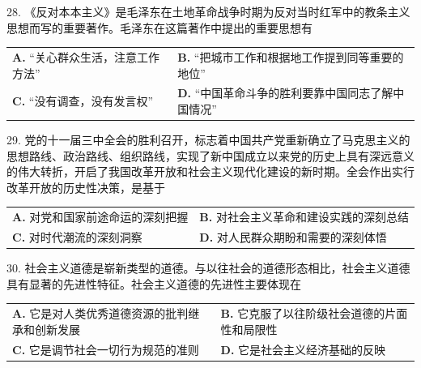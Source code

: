 \documentclass[UTF8,11pt]{ctexart}
\begin{document}
28. 《反对本本主义》是毛泽东在土地革命战争时期为反对当时红军中的教条主义思想而写的重要著作。毛泽东在这篇著作中提出的重要思想有


\begin{center}\begin{tabular}{>{\raggedright\arraybackslash}p{\dimexpr(\linewidth-4\tabcolsep)/2\relax}>{\raggedright\arraybackslash}p{\dimexpr(\linewidth-4\tabcolsep)/2\relax}}
\textbf{A.} “关心群众生活，注意工作方法” & \textbf{B.} “把城市工作和根据地工作提到同等重要的地位”\\[.35em]
\textbf{C.} “没有调查，没有发言权” & \textbf{D.} “中国革命斗争的胜利要靠中国同志了解中国情况”\\[.35em]\end{tabular}\end{center}

29. 党的十一届三中全会的胜利召开，标志着中国共产党重新确立了马克思主义的思想路线、政治路线、组织路线，实现了新中国成立以来党的历史上具有深远意义的伟大转折，开启了我国改革开放和社会主义现代化建设的新时期。全会作出实行改革开放的历史性决策，是基于


\begin{center}\begin{tabular}{>{\raggedright\arraybackslash}p{\dimexpr(\linewidth-4\tabcolsep)/2\relax}>{\raggedright\arraybackslash}p{\dimexpr(\linewidth-4\tabcolsep)/2\relax}}
\textbf{A.} 对党和国家前途命运的深刻把握 & \textbf{B.} 对社会主义革命和建设实践的深刻总结\\[.35em]
\textbf{C.} 对时代潮流的深刻洞察 & \textbf{D.} 对人民群众期盼和需要的深刻体悟\\[.35em]\end{tabular}\end{center}

30. 社会主义道德是崭新类型的道德。与以往社会的道德形态相比，社会主义道德具有显著的先进性特征。社会主义道德的先进性主要体现在


\begin{center}\begin{tabular}{>{\raggedright\arraybackslash}p{\dimexpr(\linewidth-4\tabcolsep)/2\relax}>{\raggedright\arraybackslash}p{\dimexpr(\linewidth-4\tabcolsep)/2\relax}}
\textbf{A.} 它是对人类优秀道德资源的批判继承和创新发展 & \textbf{B.} 它克服了以往阶级社会道德的片面性和局限性\\[.35em]
\textbf{C.} 它是调节社会一切行为规范的准则 & \textbf{D.} 它是社会主义经济基础的反映\\[.35em]\end{tabular}\end{center}
\end{document}
